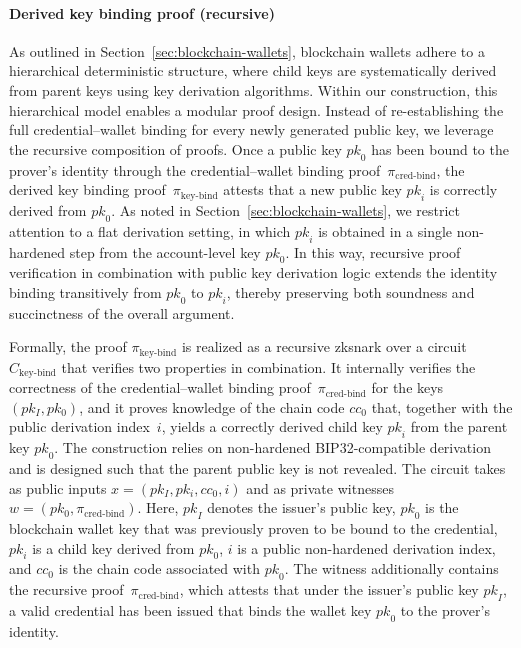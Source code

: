 \paragraph{Derived key binding proof (recursive)}
As outlined in Section~\ref{sec:blockchain-wallets}, blockchain wallets adhere to a hierarchical deterministic structure, where child keys are systematically derived from parent keys using key derivation algorithms. Within our construction, this hierarchical model enables a modular proof design. Instead of re-establishing the full credential–wallet binding for every newly generated public key, we leverage the recursive composition of proofs. Once a public key $\mathit{pk}_0$ has been bound to the prover’s identity through the credential–wallet binding proof~$\pi_{\text{cred-bind}}$, the derived key binding proof~$\pi_{\text{key-bind}}$ attests that a new public key $\mathit{pk}_i$ is correctly derived from $\mathit{pk}_0$. As noted in Section~\ref{sec:blockchain-wallets}, we restrict attention to a flat derivation setting, in which $\mathit{pk}_i$ is obtained in a single non-hardened step from the account-level key $\mathit{pk}_0$. In this way, recursive proof verification in combination with public key derivation logic extends the identity binding transitively from $\mathit{pk}_0$ to $\mathit{pk}_i$, thereby preserving both soundness and succinctness of the overall argument.

Formally, the proof $\pi_{\text{key-bind}}$ is realized as a recursive \acrshort{zksnark} over a circuit $C_{\text{key-bind}}$ that verifies two properties in combination. It internally verifies the correctness of the credential–wallet binding proof~$\pi_{\text{cred-bind}}$ for the keys $(pk_I, pk_0)$, and it proves knowledge of the chain code $\mathit{cc}_0$ that, together with the public derivation index~$\mathit{i}$, yields a correctly derived child key $\mathit{pk}_i$ from the parent key $\mathit{pk}_0$. The construction relies on non-hardened BIP32-compatible derivation and is designed such that the parent public key is not revealed. The circuit takes as public inputs $x = (pk_I, pk_i, cc_0, i)$ and as private witnesses $w = (pk_0, \pi_{\text{cred-bind}})$. Here, $\mathit{pk}_I$ denotes the issuer’s public key, $\mathit{pk}_0$ is the blockchain wallet key that was previously proven to be bound to the credential, $\mathit{pk}_i$ is a child key derived from $\mathit{pk}_0$, $\mathit{i}$ is a public non-hardened derivation index, and $\mathit{cc}_0$ is the chain code associated with $\mathit{pk}_0$. The witness additionally contains the recursive proof~$\pi_{\text{cred-bind}}$, which attests that under the issuer’s public key $\mathit{pk}_I$, a valid credential has been issued that binds the wallet key $\mathit{pk}_0$ to the prover’s identity. 

